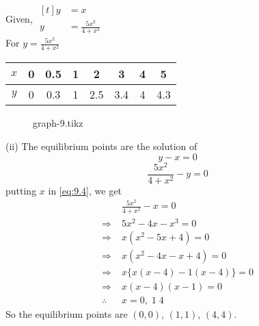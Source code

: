\documentclass[../main-sheet.tex]{subfiles}
\begin{document}
\begin{soln}
    Given, \(\begin{aligned}[t]
        y&=x\\
        y&=\frac{5x^2}{4+x^2}
    \end{aligned}\)\\
    For \(y=\frac{5x^2}{4+x^2}\)
    \begin{table}[H]
        \begin{minipage}{.4\linewidth}
            \centering
            \begin{tabular}{|c|c|c|c|c|c|c|c|}
                \hline
                \(x\)&0&0.5&1&2&3&4&5\\
                \hline
                \(y\)&0&0.3&1&2.5&3.4&4&4.3\\\hline
            \end{tabular}
        \end{minipage}\quad
        \begin{minipage}{.5\linewidth}
            \begin{figure}[H]
                \centering
                {graph-9.tikz}
            \end{figure}
        \end{minipage}
    \end{table}
    
    
    (ii) The equilibrium points are the solution of
    \begin{equation}
        y-x=0\label{eq:9.3}
    \end{equation}
    \begin{equation}
        \frac{5x^2}{4+x^2}-y=0\label{eq:9.4}
    \end{equation}
    putting \(x\) in \eqref{eq:9.4}, we get
    \begin{align*}
        &\frac{5x^2}{4+x^2}-x=0\\
        \Rightarrow\;&5x^2-4x-x^3=0\\
        \Rightarrow\;&x(x^2-5x+4)=0\\
        \Rightarrow\;&x(x^2-4x-x+4)=0\\
        \Rightarrow\;&x\{x(x-4)-1(x-4)\}=0\\
        \Rightarrow\;&x(x-4)(x-1)=0\\
        \therefore\;&x=0,\;1\;4
    \end{align*}
    So the equilibrium points are \((0,0)\), \((1,1)\), \((4,4)\).


\end{soln}
\end{document}
